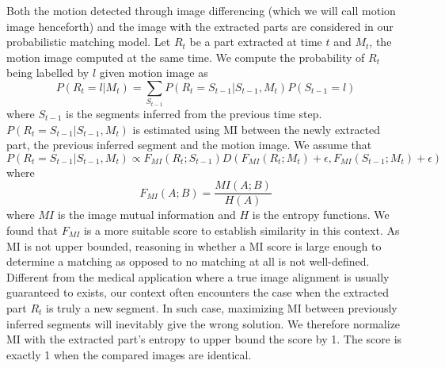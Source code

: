 \documentclass{article}
\begin{document}
Both the motion detected through image differencing (which we will call motion image henceforth) and the image with the extracted parts are considered in our probabilistic matching model. Let $R_t$ be a part extracted at time $t$ and $M_t$, the motion image computed at the same time. We compute the probability of $R_t$ being labelled by $l$ given motion image as
\begin{equation}
	P(R_t = l | M_t) = \sum_{S_{t-1}} P(R_t = S_{t-1} | S_{t-1}, M_t)P(S_{t-1} = l)
\end{equation}
where $S_{t-1}$ is the segments inferred from the previous time step. $P(R_t = S_{t-1} | S_{t-1}, M_t)$ is estimated using MI between the newly extracted part, the previous inferred segment and the motion image. We assume that 
\begin{equation}\label{eq:blab}
	P(R_t = S_{t-1} | S_{t-1}, M_t) \propto F_{MI}(R_t; S_{t-1})D(F_{MI}(R_t; M_t) + \epsilon, F_{MI}(S_{t-1}; M_t) + \epsilon)
\end{equation}
where
\begin{equation}
	F_{MI}(A;B) = \frac{MI(A;B)}{H(A)}
\end{equation}
where $MI$ is the image mutual information and $H$ is the entropy functions. We found that $F_{MI}$ is a more suitable score to establish similarity in this context. As MI is not upper bounded, reasoning in whether a MI score is large enough to determine a matching as opposed to no matching at all is not well-defined. Different from the medical application where a true image alignment is usually guaranteed to exists, our context often encounters the case when the extracted part $R_t$ is truly a new segment. In such case, maximizing MI between previously inferred segments will inevitably give the wrong solution. We therefore normalize MI with the extracted part's entropy to upper bound the score by 1. The score is exactly 1 when the compared images are identical. 
\end{document}
